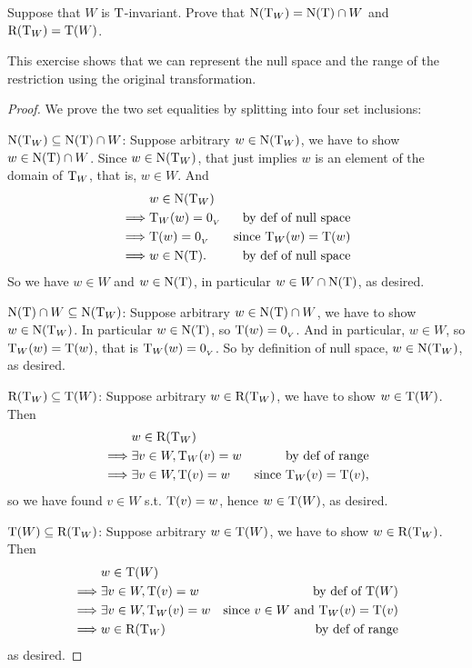 \begin{exercise} \label{exercise 2.1.33}
Suppose that \(W\) is \(\mathrm{T}\)-invariant.
Prove that \(\mathrm{N}(\mathrm{T}_W) = \mathrm{N(T)} \cap W\) and \(\mathrm{R}(\mathrm{T}_W) = \mathrm{T}(W)\).
\end{exercise}

\begin{note}
This exercise shows that we can represent the null space and the range of the restriction using the original transformation.
\end{note}

\begin{proof} We prove the two set equalities by splitting into four set inclusions:

\(\mathrm{N}(\mathrm{T}_W) \subseteq \mathrm{N(T)} \cap W\):
Suppose arbitrary \(w \in \mathrm{N}(\mathrm{T}_W)\), we have to show \(w \in \mathrm{N(T)} \cap W\).
Since \(w \in \mathrm{N}(\mathrm{T}_W)\), that just implies \(w\) is an element of the domain of \(\mathrm{T}_W\), that is, \(w \in W\).
And
\begin{align*}
             & w \in \mathrm{N}(\mathrm{T}_W) \\
    \implies & \mathrm{T}_W(w) = 0_{_V} & \text{by def of null space} \\
    \implies & \mathrm{T}(w) = 0_{_V} & \text{since \(\mathrm{T}_W(w) = \mathrm{T}(w)\)} \\
    \implies & w \in \mathrm{N(T)}. & \text{by def of null space}
\end{align*}
So we have \(w \in W\) and \(w \in \mathrm{N(T)}\), in particular \(w \in W \cap \mathrm{N(T)}\), as desired.

\(\mathrm{N(T)} \cap W \subseteq \mathrm{N}(\mathrm{T}_W)\):
Suppose arbitrary \(w \in \mathrm{N(T)} \cap W\), we have to show \(w \in \mathrm{N}(\mathrm{T}_W)\).
In particular \(w \in \mathrm{N(T)}\), so \(\mathrm{T}(w) = 0_{_V}\).
And in particular, \(w \in W\), so \(\mathrm{T}_W(w) = \mathrm{T}(w)\), that is \(\mathrm{T}_W(w) = 0_{_V}\).
So by definition of null space, \(w \in \mathrm{N}(\mathrm{T}_W)\), as desired.

\(\mathrm{R}(\mathrm{T}_W) \subseteq \mathrm{T}(W)\):
Suppose arbitrary \(w \in \mathrm{R}(\mathrm{T}_W)\), we have to show \(w \in \mathrm{T}(W)\).
Then
\begin{align*}
             & w \in \mathrm{R}(\mathrm{T}_W) \\
    \implies & \exists v \in W, \mathrm{T}_W(v) = w & \text{by def of range} \\
    \implies & \exists v \in W, \mathrm{T}(v) = w & \text{since \(\mathrm{T}_W(v) = \mathrm{T}(v)\)},
\end{align*}
so we have found \(v \in W\) s.t. \(\mathrm{T}(v) = w\), hence \(w \in \mathrm{T}(W)\), as desired.

\(\mathrm{T}(W) \subseteq \mathrm{R}(\mathrm{T}_W)\):
Suppose arbitrary \(w \in \mathrm{T}(W)\), we have to show \(w \in \mathrm{R}(\mathrm{T}_W)\).
Then
\begin{align*}
             & w \in \mathrm{T}(W) \\
    \implies & \exists v \in W, \mathrm{T}(v) = w & \text{by def of \(\mathrm{T}(W)\)} \\
    \implies & \exists v \in W, \mathrm{T}_W(v) = w & \text{since \(v \in W\) and \(\mathrm{T}_W(v) = \mathrm{T}(v)\)} \\
    \implies & w \in \mathrm{R}(\mathrm{T}_W) & \text{by def of range}
\end{align*}
as desired.
\end{proof}


